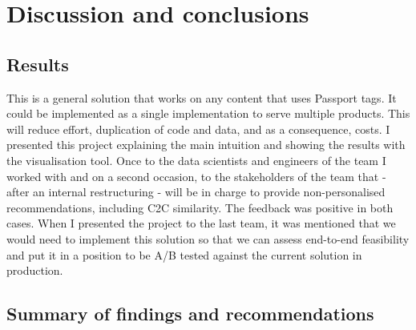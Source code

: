 \section{Discussion and conclusions}

\subsection{Results}

This is a general solution that works on any content that uses Passport tags. It could be implemented as a single implementation
to serve multiple products. This will reduce effort, duplication of code and data, and as a consequence, costs.
I presented this project explaining the main intuition and showing the results with the visualisation tool.
Once to the data scientists and engineers of the team I worked with and on a second occasion,
to the stakeholders of the team that - after an internal restructuring - will be in charge to provide non-personalised recommendations,
including C2C similarity. The feedback was positive in both cases. When I presented the project to the last team, it was mentioned
that we would need to implement this solution so that we can assess end-to-end feasibility and put it in a position to be A/B tested
against the current solution in production.

\subsection{Summary of findings and recommendations}

